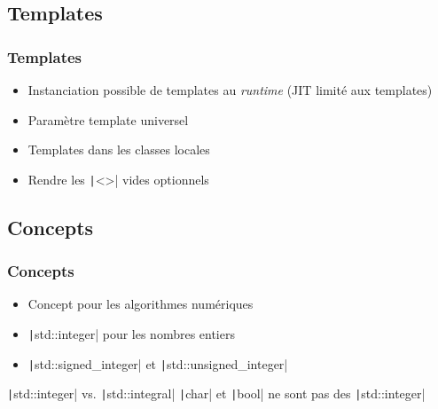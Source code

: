 \documentclass[C++.tex]{subfiles}
\begin{document}
\subsection*{Templates}
\begin{frame}[fragile]
	\frametitle{Templates}
	\begin{itemize}
		\item Instanciation possible de templates au \textit{runtime} (JIT limité aux templates)


		\item Paramètre template universel


		\item Templates dans les classes locales
		\item Rendre les \texttt|<>| vides optionnels
	\end{itemize}

\end{frame}

\subsection*{Concepts}
\begin{frame}[fragile]
	\frametitle{Concepts}
	\begin{itemize}
		\item Concept pour les algorithmes numériques
		\item \texttt|std::integer| pour les nombres entiers
		\item \texttt|std::signed_integer| et \texttt|std::unsigned_integer|
	\end{itemize}

	\begin{block}{\texttt|std::integer| vs. \texttt|std::integral|}
		\texttt|char| et \texttt|bool| ne sont pas des \texttt|std::integer|
	\end{block}

\end{frame}
\end{document}
